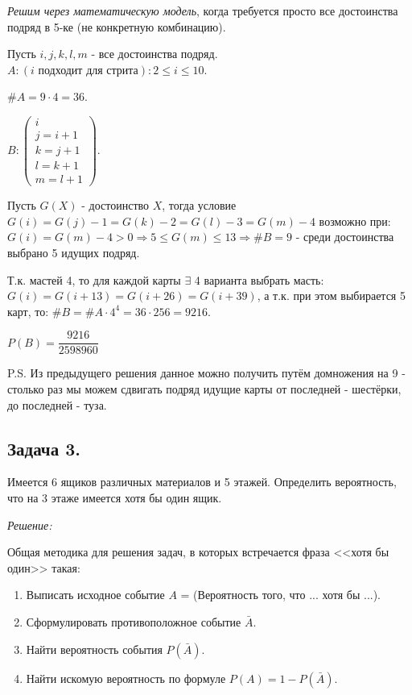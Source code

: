 \begin{enumerate}
	\textit{Решим через математическую модель}, когда требуется просто все достоинства подряд в 5-ке (не конкретную комбинацию).
	
	\noindent Пусть $i, j, k, l, m$ - все достоинства подряд. $A: (i \text{ подходит для стрита}): 2 \le i \le 10$. 
	
	\noindent $\#A = 9 \cdot 4 = 36$.
	
	\noindent $B: \begin{pmatrix} i \\ j = i + 1 \\ k = j + 1 \\ l = k + 1 \\ m = l + 1 \end{pmatrix}$.
	
	\noindent Пусть $G(X)$ - достоинство $X$, тогда условие $G(i) = G(j) - 1 = G(k) - 2 = G(l) - 3 = G(m) - 4$ возможно при: $G(i) = G(m) - 4 > 0 \Rightarrow 5 \le G(m) \le 13 \Rightarrow \#B = 9$ - среди достоинства выбрано 5 идущих подряд.
	
	\noindent Т.к. мастей 4, то для каждой карты $\exists$ 4 варианта выбрать масть: $G(i) = G(i + 13) = G(i + 26) = G(i + 39)$, а т.к. при этом выбирается 5 карт, то: $\#B = \#A \cdot 4^4 = 36 \cdot 256 = 9216$.
	
	\noindent $P(B) = \dfrac{9216}{2598960}$
	
	P.S. Из предыдущего решения данное можно получить путём домножения на 9 - столько раз мы можем сдвигать подряд идущие карты от последней - шестёрки, до последней - туза.
\end{enumerate}

\subsection{Задача 3.}

Имеется 6 ящиков различных материалов и 5 этажей. Определить вероятность, что на 3 этаже имеется хотя бы один ящик.

\textit{Решение:}

\noindent Общая методика для решения задач, в которых встречается фраза <<хотя бы один>> такая:

\begin{enumerate}
	\item Выписать исходное событие $A$ = (Вероятность того, что ... хотя бы ...).
	\item Сформулировать противоположное событие $\bar A$.
	\item Найти вероятность события $P(\bar A)$.
	\item Найти искомую вероятность по формуле $P(A) = 1 - P(\bar A)$.
\end{enumerate}

